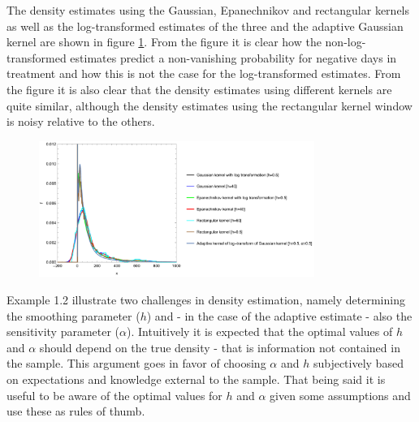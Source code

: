 \begin{example}
\begin{equation}
	\end{equation}
	The density estimates using the Gaussian, Epanechnikov and rectangular kernels as well as the log-transformed estimates of the three and the adaptive Gaussian kernel are shown in figure \ref{fig:1}. From the figure it is clear how the non-log-transformed estimates predict a non-vanishing probability for negative days in treatment and how this is not the case for the log-transformed estimates. From the figure it is also clear that the density estimates using different kernels are quite similar, although the density estimates using the rectangular kernel window is noisy relative to the others.
	\begin{figure}[H]
		\centering
		\captionsetup{width=0.95\textwidth}
		\includegraphics[width=0.8\textwidth]{figures/P11.pdf}
		\caption{}
		\label{fig:1}
	\end{figure}
\end{example}
\noindent Example 1.2 illustrate two challenges in density estimation, namely determining the smoothing parameter ($h$) and - in the case of the adaptive estimate - also the sensitivity parameter ($\alpha$). Intuitively it is expected that the optimal values of $h$ and $\alpha$ should depend on the true density - that is information not contained in the sample. This argument goes in favor of choosing $\alpha$ and $h$ subjectively based on expectations and knowledge external to the sample. That being said it is useful to be aware of the optimal values for $h$ and $\alpha$ given some assumptions and use these as rules of thumb. 

